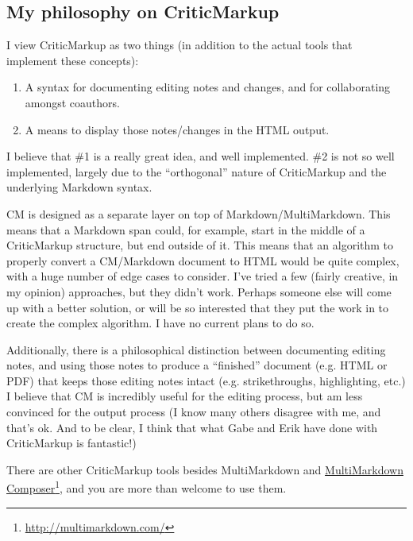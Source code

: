 \subsection{My philosophy on CriticMarkup}
\label{myphilosophyoncriticmarkup}

I view CriticMarkup as two things (in addition to the actual tools that implement these concepts):

\begin{enumerate}
\item A syntax for documenting editing notes and changes, and for collaborating amongst coauthors.

\item A means to display those notes\slash{}changes in the HTML output.

\end{enumerate}

I believe that \#1 is a really great idea, and well implemented. \#2 is not so well implemented, largely due to the ``orthogonal'' nature of CriticMarkup and the underlying Markdown syntax.

CM is designed as a separate layer on top of Markdown\slash{}MultiMarkdown. This means that a Markdown span could, for example, start in the middle of a CriticMarkup structure, but end outside of it. This means that an algorithm to properly convert a CM\slash{}Markdown document to HTML would be quite complex, with a huge number of edge cases to consider. I've tried a few (fairly creative, in my opinion) approaches, but they didn't work. Perhaps someone else will come up with a better solution, or will be so interested that they put the work in to create the complex algorithm. I have no current plans to do so.

Additionally, there is a philosophical distinction between documenting editing notes, and using those notes to produce a ``finished'' document (e.g. HTML or PDF) that keeps those editing notes intact (e.g. strikethroughs, highlighting, etc.) I believe that CM is incredibly useful for the editing process, but am less convinced for the output process (I know many others disagree with me, and that's ok. And to be clear, I think that what Gabe and Erik have done with CriticMarkup is fantastic!)

There are other CriticMarkup tools besides MultiMarkdown and \href{http://multimarkdown.com/}{MultiMarkdown Composer}\footnote{\href{http://multimarkdown.com/}{http:\slash{}\slash{}multimarkdown.com\slash{}}}, and you are more than welcome to use them.

